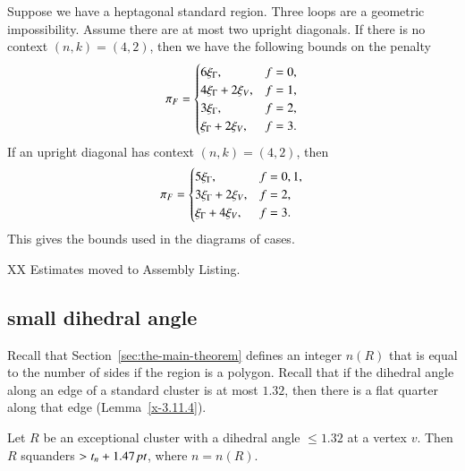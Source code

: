 Suppose we have a heptagonal standard region.  Three loops are a
geometric impossibility. Assume there are at most two upright
diagonals.
 If there is no context $(n,k)=(4,2)$,
 then we have the following bounds on the penalty
    $$
    {\pi_F} = \begin{cases} 6\xi_\Gamma, & f=0,\\
                 4\xi_\Gamma+2\xi_V, & f=1,\\
                3\xi_\Gamma, & f=2,\\
                \xi_\Gamma+2\xi_V, & f=3.
            \end{cases}
    $$
If an upright diagonal has context $(n,k)=(4,2)$, then
    $$
    {\pi_F} = \begin{cases} 5\xi_\Gamma, & f=0,1,\\
                3\xi_\Gamma + 2\xi_V, & f=2,\\
                \xi_\Gamma + 4 \xi_V, &f = 3.\\
            \end{cases}
    $$
This gives the bounds used in the diagrams of cases.




XX Estimates moved to Assembly Listing.

\subsection{small dihedral angle} %
\label{sec:small-dih}

Recall that Section~\ref{sec:the-main-theorem} defines an integer $n(R)$
that is equal to the number of sides if the region is a polygon.  Recall
that if the dihedral angle along an edge of a standard cluster is at
most $1.32$, then there is a flat quarter along that edge
(Lemma~\ref{x-3.11.4}).



\begin{lemma}
Let $R$ be an exceptional cluster with a dihedral angle
$\le1.32$ at a vertex $v$. Then $R$ squanders $>t_n+1.47\,\hbox{\it pt}$, where
$n=n(R)$.
\end{lemma}

